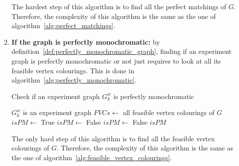 \begin{enumerate}
        The hardest step of this algorithm is to find all the perfect matchings of $G$.
        Therefore, the complexity of this algorithm is the same as the one of algorithm~\ref{alg:perfect_matchings}.

    \item \textbf{If the graph is perfectly monochromatic:} by definition~\ref{def:perfectly_monochromatic_graph}, finding if an experiment graph is perfectly monochromatic or not just requires to look at all its feasible vertex colourings.
        This is done in algorithm~\ref{alg:perfectly_monochromatic}.

        \begin{algorithm}
            \caption{Check if an experiment graph $G_k^w$ is perfectly monochromatic}
            \label{alg:perfectly_monochromatic}
            \begin{algorithmic}
                \Require $G_k^w$ is an experiment graph
                \State $FVCs \gets$ all feasible vertex colourings of $G$
                \State $isPM \gets$ True
                        \State $isPM \gets$ False
                        \State $isPM \gets$ False
                    \EndIf
                \EndFor
                \State \Return $isPM$
            \end{algorithmic}
        \end{algorithm}

        The only hard step of this algorithm is to find all the feasible vertex colourings of $G$.
        Therefore, the complexity of this algorithm is the same as the one of algorithm~\ref{alg:feasible_vertex_colourings}.


\end{enumerate}
